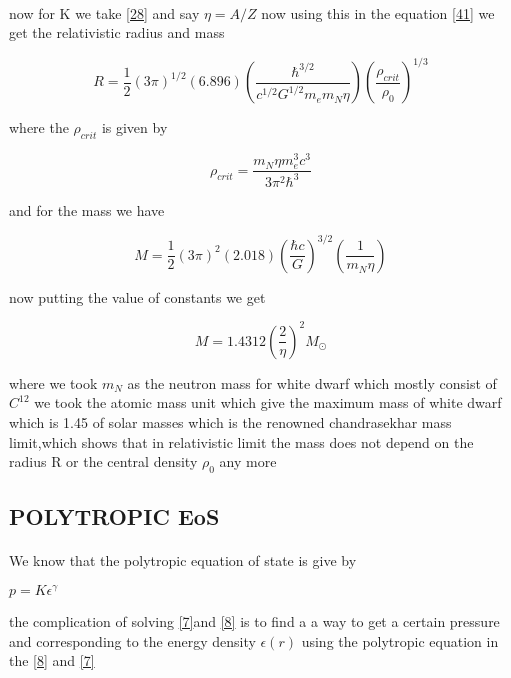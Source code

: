 \documentclass{report}
\begin{document}
\paragraph{ }
now for K we take \ref{28} and say $\eta = A/Z$ now using this in the equation \ref{41} we get the relativistic radius and mass 
\begin{center}
\begin{equation}
R = \frac{1}{2} (3\pi)^{1/2} (6.896)\left(\frac{\hbar^{3/2}}{c^{1/2}G^{1/2}m_e m_N \eta} \right)\left(\frac{\rho_{crit}}{\rho_0} \right)^{1/3}
\label{42}
\end{equation}
\end{center}
where the $\rho_{crit}$ is given by 
\begin{center}
\begin{equation}
\rho_{crit} = \frac{m_N\eta m_e^3c^3}{3\pi ^2 \hbar^3}
\label{43}
\end{equation}
\end{center}
and for the mass  we have 
\begin{center}
\begin{equation}
M= \frac{1}{2}(3\pi)^2(2.018)\left( \frac{\hbar c}{G} \right)^{3/2}\left(\frac{1}{m_N\eta}\right)
\label{44}
\end{equation}
\end{center}
now putting the value of constants we get 
\begin{center}
\begin{equation}
M = 1.4312 \left(\frac{2}{\eta}\right)^2 M_\odot
\label{45}
\end{equation}
\end{center}
where we took $m_N$ as the neutron mass for white dwarf  which mostly consist of $C^{12}$ we took the atomic mass unit which give the maximum mass of white dwarf which is 1.45 of solar masses which is the renowned chandrasekhar mass limit,which shows that in relativistic limit the mass does not depend on the radius R or the central density $\rho_0$ any more 
\subsection{POLYTROPIC EoS}
\paragraph{ }
We know that the polytropic equation of state is give by 
\begin{center}
$p = K\epsilon^\gamma $
\end{center}
the complication of solving \ref{7}and \ref{8} is to find a a way to get a certain pressure and corresponding to the energy density $\epsilon(r)$ using the polytropic equation in the \ref{8} and \ref{7}
\newpage
\end{document}
